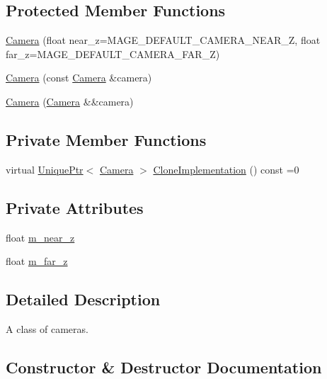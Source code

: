 \subsection*{Protected Member Functions}
\begin{DoxyCompactItemize}
\item 
\hyperlink{classmage_1_1_camera_ae734b9b92203a384410e83f117fa4427}{Camera} (float near\+\_\+z=M\+A\+G\+E\+\_\+\+D\+E\+F\+A\+U\+L\+T\+\_\+\+C\+A\+M\+E\+R\+A\+\_\+\+N\+E\+A\+R\+\_\+Z, float far\+\_\+z=M\+A\+G\+E\+\_\+\+D\+E\+F\+A\+U\+L\+T\+\_\+\+C\+A\+M\+E\+R\+A\+\_\+\+F\+A\+R\+\_\+Z)
\item 
\hyperlink{classmage_1_1_camera_a28d9280bd7067ec4d28392558cc2b767}{Camera} (const \hyperlink{classmage_1_1_camera}{Camera} \&camera)
\item 
\hyperlink{classmage_1_1_camera_a4dc6f31c108b28abe9580ef6d7a06713}{Camera} (\hyperlink{classmage_1_1_camera}{Camera} \&\&camera)
\end{DoxyCompactItemize}
\subsection*{Private Member Functions}
\begin{DoxyCompactItemize}
\item 
virtual \hyperlink{namespacemage_a8c307fbcc33bce9b7f2aa4c26c3b95cf}{Unique\+Ptr}$<$ \hyperlink{classmage_1_1_camera}{Camera} $>$ \hyperlink{classmage_1_1_camera_aedf6e7d6ee6c6e9e82da814ef8e705ab}{Clone\+Implementation} () const =0
\end{DoxyCompactItemize}
\subsection*{Private Attributes}
\begin{DoxyCompactItemize}
\item 
float \hyperlink{classmage_1_1_camera_a685f8700a29d1f1eff2bec353c3ec970}{m\+\_\+near\+\_\+z}
\item 
float \hyperlink{classmage_1_1_camera_abe2eeca725ce3da238256007454b241f}{m\+\_\+far\+\_\+z}
\end{DoxyCompactItemize}


\subsection{Detailed Description}
A class of cameras. 

\subsection{Constructor \& Destructor Documentation}
\hypertarget{classmage_1_1_camera_aa4718c93578d160299bdc24039cc256f}{}\label{classmage_1_1_camera_aa4718c93578d160299bdc24039cc256f} 

